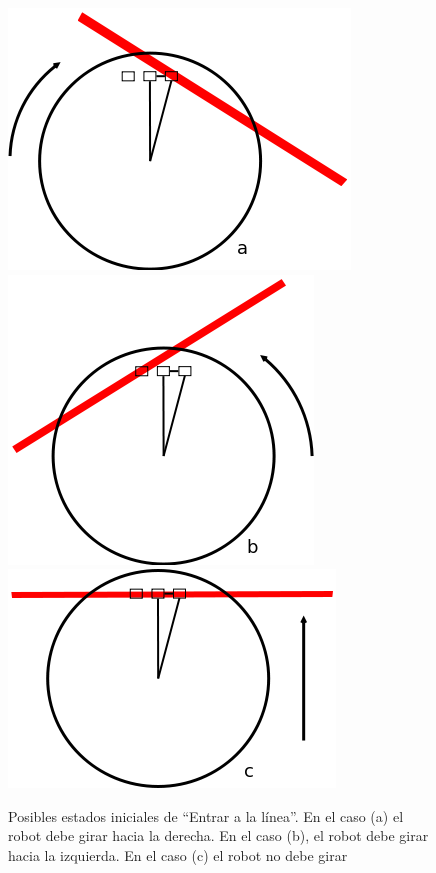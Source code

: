 \begin{figure}[htp]
\begin{center}
\includegraphics[scale=0.4]{comportamientos/figures/floorSensorsLine.png}
\includegraphics[scale=0.4]{comportamientos/figures/floorSensorsLine1.png}
\includegraphics[scale=0.4]{comportamientos/figures/floorSensorsLine2.png}
\caption[Posibles estados iniciales de ``Entrar a la l\'inea'']{Posibles
		estados iniciales de ``Entrar a la l\'inea''. En el caso (a) el
		robot debe girar hacia la derecha. En el caso (b), el robot debe
		girar hacia la izquierda. En el caso (c) el robot no debe girar}
\label{fig:floorSensorsInitialStates}
\end{center}
\end{figure}

